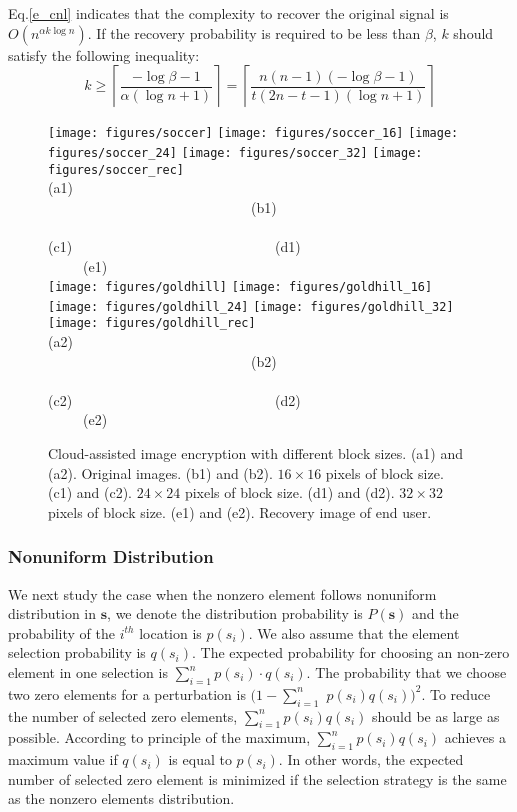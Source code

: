 \documentclass[conference]{IEEEtran}
\begin{document}
Eq.\ref{e_cnl} indicates  that the complexity to recover  the original signal is $O(n^{\alpha k\log n})$. If the recovery probability is required to be less than $\beta$, $k$ should satisfy the following inequality:
\begin{equation*}
    k\geq \left\lceil\frac{-\log\beta-1}{\alpha (\log n+1)}\right\rceil=\left\lceil\frac{n(n-1)(-\log\beta-1)}{t(2n-t-1) (\log n+1)} \right\rceil
\end{equation*}

\begin{figure*}[t]
\begin{center}
  \texttt{[image: figures/soccer]}
  \texttt{[image: figures/soccer\_16]}
  \texttt{[image: figures/soccer\_24]}
  \texttt{[image: figures/soccer\_32]}
  \texttt{[image: figures/soccer\_rec]}  \\
 {\footnotesize (a1) ~~~~~~~~~~~~~~~~~~~~~~~~~~~~~(b1)~~~~~~~~~~~~~~~~~~~~~~~~~~~~~ (c1)~~~~~~~~~~~~~~~~~~~~~~~~~~~~~(d1)~~~~~~~~~~~~~~~~~~~~~~~~~~~~~(e1) }\\
  \texttt{[image: figures/goldhill]}
  \texttt{[image: figures/goldhill\_16]}
  \texttt{[image: figures/goldhill\_24]}
  \texttt{[image: figures/goldhill\_32]}
  \texttt{[image: figures/goldhill\_rec]}  \\
   {\footnotesize (a2) ~~~~~~~~~~~~~~~~~~~~~~~~~~~~~(b2)~~~~~~~~~~~~~~~~~~~~~~~~~~~~~ (c2)~~~~~~~~~~~~~~~~~~~~~~~~~~~~~(d2)~~~~~~~~~~~~~~~~~~~~~~~~~~~~~(e2) }\\
 \end{center}
  \caption{{\footnotesize Cloud-assisted image encryption with different block sizes. (a1) and (a2). Original images. (b1) and (b2). $16\times 16$ pixels of block size. (c1) and (c2). $24\times 24$ pixels of block size. (d1) and (d2).   $32\times 32$ pixels of block size. (e1) and (e2). Recovery image of end user.}}\label{f_se_diff_block_size}
\end{figure*}

\subsubsection{Nonuniform Distribution}
We next study the case when  the nonzero element follows nonuniform distribution in $\mathbf{s}$, we denote the distribution probability is $P(\mathbf{s})$ and the probability of the $i^{th}$ location is $p(s_i)$. We also assume that the element selection probability is $q(s_i)$. The expected probability  for choosing an non-zero element in one selection is
 $\sum_{i=1}^n p(s_i)\cdot q(s_i)$. The probability that we choose  two zero elements for a perturbation is  $(1-\sum_{i=1}^n $ $p(s_i)q(s_i))^2$. To reduce the number of selected zero elements, $\sum_{i=1}^n p(s_i)q(s_i)$ should be as large as possible. According to principle of the maximum, $\sum_{i=1}^n p(s_i)q(s_i)$ achieves a maximum value  if $q(s_i)$ is equal to $p(s_i)$. In other words, the expected number of selected zero element is minimized if the selection strategy is the same as the nonzero elements distribution.
\end{document}
